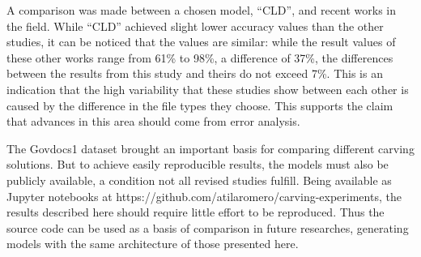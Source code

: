 A comparison was made between a chosen model, ``CLD'', and recent works in the field. While ``CLD'' achieved slight lower accuracy values than the other studies, it can be noticed that the values are similar:
while the result values of these other works range from 61\% to 98\%, a difference of 37\%, the differences between the results from this study and theirs do not exceed 7\%. This is an indication that the high  variability that these studies show between each other is caused by the difference in the file types they choose. This supports the claim that advances in this area should come from error analysis.

The Govdocs1 dataset brought an important basis for comparing different carving solutions. But to achieve easily reproducible results, the models must also be publicly available, a condition not all revised studies fulfill. Being available as Jupyter notebooks at https://github.com/atilaromero/carving-experiments, the results described here should require little effort to be reproduced. Thus the source code can be used as a basis of comparison in future researches, generating models with the same architecture of those presented here.
